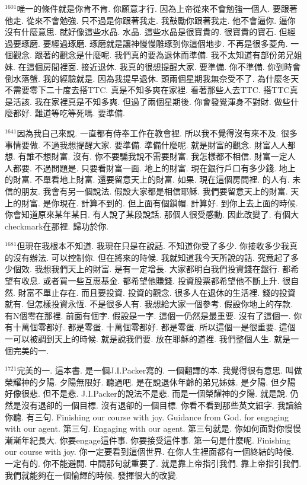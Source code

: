 \documentclass{book}
\begin{document}
$^{1601}$唯一的條件就是你肯不肯.
你願意才行.
因為上帝從來不會勉強一個人.
要跟著他走.
從來不會勉強.
只不過是你跟著我走.
我鼓勵你跟著我走.
他不會逼你.
逼你沒有什麼意思.
就好像這些水晶.
水晶.
這些水晶是很寶貴的.
很寶貴的寶石.
但經過要琢磨.
要經過琢磨.
琢磨就是讓神慢慢雕琢到你這個地步.
不再是很多菱角.
一個觀念.
跟著的觀念是什麼呢.
我們真的要為退休而準備.
我不太知道有部份弟兄姐妹.
在這個房間裡面.
接近退休.
我真的很想提醒大家.
要準備.
你不準備.
你到時會倒水落蟹.
我的經驗就是.
因為我提早退休.
頭兩個星期我無奈受不了.
為什麼冬天不需要零下二十度去搭TTC.
真是不知多爽在家裡.
看著那些人去TTC.
搭TTC真是活該.
我在家裡真是不知多爽.
但過了兩個星期後.
你會發覺渾身不對財.
做些什麼都好.
難道等吃等死嗎.
要準備.

$^{1641}$因為我自己來說.
一直都有侍奉工作在教會裡.
所以我不覺得沒有來不及.
很多事情要做.
不過我想提醒大家.
要準備.
準備什麼呢.
就是財富的觀念.
財富人人都想.
有誰不想財富.
沒有.
你不要騙我說不需要財富.
我怎樣都不相信.
財富一定人人都要.
不過問題是.
只要看財富一面.
地上的財富.
現在銀行戶口有多少錢.
地上的財富.
不單看地上財富.
還要留意天上的財富.
如果.
現在這個房間裡.
的人有.
未信的朋友.
我會有另一個說法.
假設大家都是相信耶穌.
我們要留意天上的財富.
天上的財富.
是你現在.
計算不到的.
但上面有個鎖帽.
計算好.
到你上去上面的時候.
你會知道原來某年某日.
有人說了某段說話.
那個人很受感動.
因此改變了.
有個大checkmark在那裡.
歸功於你.

$^{1681}$但現在我根本不知道.
我現在只是在說話.
不知道你受了多少.
你接收多少我真的沒有辦法.
可以控制你.
但在將來的時候.
我就知道我今天所說的話.
究竟起了多少個效.
我想我們天上的財富.
是有一定增長.
大家都明白我們投資錢在銀行.
都希望有收息.
或者買一些互惠基金.
都希望他賺錢.
投資股票都希望他不斷上升.
很自然.
財富不單止存在.
而且要投資.
投資的觀念.
很多人在退休的生活裡.
錢的投資就有.
但怎樣投資永恆.
不是很多人有.
我想給大家一個參考.
假設你地上的存款.
有N個零在那裡.
前面有個字.
假設是一字.
這個一仍然是最重要.
沒有了這個一.
你有十萬個零都好.
都是零蛋.
十萬個零都好.
都是零蛋.
所以這個一是很重要.
這個一可以被調到天上的時候.
就是說我們要.
放在耶穌的道裡.
我們整個人生.
就是一個完美的一.

$^{1721}$完美的一.
這本書.
是一個J.I.Packer寫的.
一個翻譯的本.
我覺得很有意思.
叫做榮耀神的夕陽.
夕陽無限好.
聽過吧.
是在說退休年齡的弟兄姊妹.
是夕陽.
但夕陽好像很悲.
但不是悲.
J.I.Packer的說法不是悲.
而是一個榮耀神的夕陽.
就是說.
仍然是沒有退卻的一個目標.
沒有退卻的一個目標.
你看不看到那些英文細字.
我讀給你聽.
有三句.
Finishing our course with joy.
Guidance from God.
for engaging with our agent.
第三句.
Engaging with our agent.
第三句就是.
你如何面對你慢慢漸漸年紀長大.
你要engage這件事.
你要接受這件事.
第一句是什麼呢.
Finishing our course with joy.
你一定要看到這個世界.
在你人生裡面都有一個終結的時候.
一定有的.
你不能避開.
中間那句就重要了.
就是靠上帝指引我們.
靠上帝指引我們.
我們就能夠在一個愉輝的時候.
發揮很大的改變.
\end{document}
